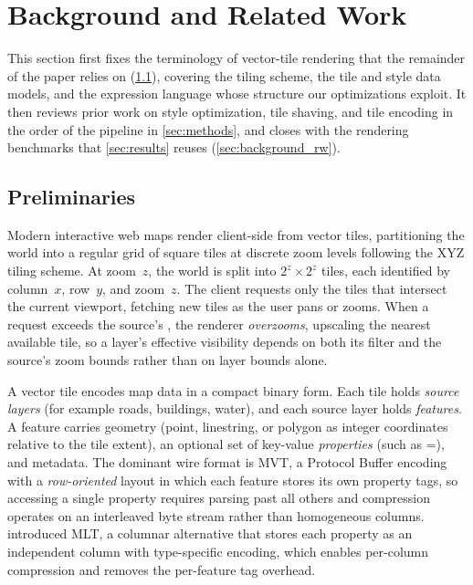 
\section{Background and Related Work}\label{sec:background}

This section first fixes the terminology of vector-tile rendering that the remainder of the paper relies on (\cref{sec:background_prelim}), covering the tiling scheme, the tile and style data models, and the expression language whose structure our optimizations exploit.
It then reviews prior work on style optimization, tile shaving, and tile encoding in the order of the pipeline in \cref{sec:methods}, and closes with the rendering benchmarks that \cref{sec:results} reuses (\cref{sec:background_rw}).

\subsection{Preliminaries}\label{sec:background_prelim}

Modern interactive web maps render client-side from vector tiles, partitioning the world into a regular grid of square tiles at discrete zoom levels following the XYZ tiling scheme.
At zoom~$z$, the world is split into $2^z \times 2^z$ tiles, each identified by column~$x$, row~$y$, and zoom~$z$.
The client requests only the tiles that intersect the current viewport, fetching new tiles as the user pans or zooms.
When a request exceeds the source's , the renderer \emph{overzooms}, upscaling the nearest available tile, so a layer's effective visibility depends on both its filter and the source's zoom bounds rather than on layer bounds alone.

A vector tile encodes map data in a compact binary form.
Each tile holds \emph{source layers} (for example roads, buildings, water), and each source layer holds \emph{features}.
A feature carries geometry (point, linestring, or polygon as integer coordinates relative to the tile extent), an optional set of key-value \emph{properties} (such as =), and metadata.
The dominant wire format is \ac{MVT}, a Protocol Buffer encoding with a \emph{row-oriented} layout in which each feature stores its own property tags, so accessing a single property requires parsing past all others and compression operates on an interleaved byte stream rather than homogeneous columns.
\citet{tremmelMapLibreTileNext2025b} introduced \acf{MLT}, a columnar alternative that stores each property as an independent column with type-specific encoding, which enables per-column compression and removes the per-feature tag overhead.

